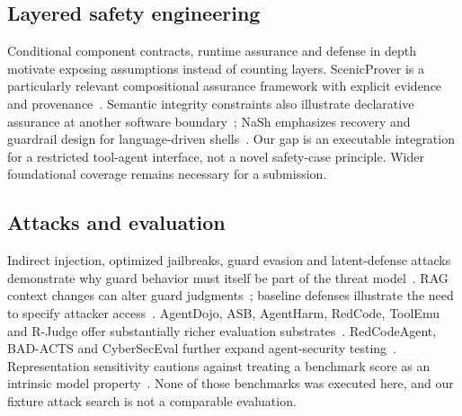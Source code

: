 \documentclass[lettersize,journal]{IEEEtran}
\begin{document}
\subsection{Layered safety engineering}
Conditional component contracts, runtime assurance and defense in depth
motivate exposing assumptions instead of counting layers. ScenicProver is a
particularly relevant compositional assurance framework with explicit evidence
and provenance~\cite{arxiv251102164}. Semantic integrity constraints also
illustrate declarative assurance at another software
boundary~\cite{arxiv250300600}; NaSh emphasizes recovery and guardrail design
for language-driven shells~\cite{arxiv250613028}. Our gap is an executable
integration for a restricted tool-agent interface, not a novel safety-case
principle. Wider foundational coverage remains necessary for a submission.

\subsection{Attacks and evaluation}
Indirect injection, optimized jailbreaks, guard evasion and latent-defense
attacks demonstrate why guard behavior must itself be part of the threat
model~\cite{arxiv230212173,arxiv230715043,arxiv250411168,arxiv241209565,arxiv250305264}.
RAG context changes can alter guard judgments~\cite{arxiv251005310}; baseline
defenses illustrate the need to specify attacker access~\cite{arxiv230900614}.
AgentDojo, ASB, AgentHarm, RedCode, ToolEmu and R-Judge offer substantially
richer evaluation substrates~\cite{arxiv240613352,arxiv241002644,arxiv241009024,arxiv241107781,arxiv230915817,arxiv240110019}.
RedCodeAgent, BAD-ACTS and CyberSecEval further expand agent-security
testing~\cite{arxiv251002609,arxiv250816481,arxiv240801605}.
Representation sensitivity cautions against treating a benchmark score as an
intrinsic model property~\cite{arxiv261003585}. None of those benchmarks was
executed here, and our fixture attack search is not a comparable evaluation.
\end{document}
